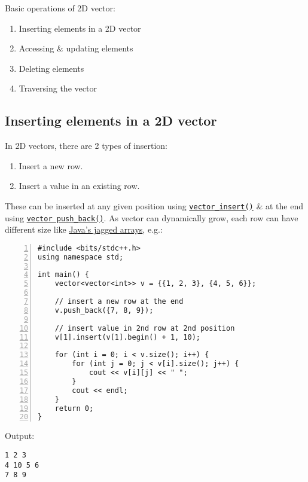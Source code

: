 \documentclass{article}
\begin{document}

Basic operations of 2D vector:
\begin{enumerate}
	\item Inserting elements in a 2D vector
	\item Accessing \& updating elements
	\item Deleting elements
	\item Traversing the vector
\end{enumerate}


\subsection{Inserting elements in a 2D vector}
In 2D vectors, there are 2 types of insertion:
\begin{enumerate}
	\item Insert a new row.
	\item Insert a value in an existing row.
\end{enumerate}
These can be inserted at any given position using \href{https://www.geeksforgeeks.org/vector-insert-function-in-cpp-stl/}{\tt vector\_insert()} \& at the end using \href{https://www.geeksforgeeks.org/vectorpush_back-vectorpop_back-c-stl/}{\tt vector push\_back()}. As vector can dynamically grow, each row can have different size like \href{https://www.geeksforgeeks.org/jagged-array-in-java/}{Java's jagged arrays}, e.g.:
\begin{Verbatim}[numbers=left,xleftmargin=5mm]
#include <bits/stdc++.h>
using namespace std;

int main() {
    vector<vector<int>> v = {{1, 2, 3}, {4, 5, 6}};
	
    // insert a new row at the end
    v.push_back({7, 8, 9});
	
    // insert value in 2nd row at 2nd position
    v[1].insert(v[1].begin() + 1, 10);
	
    for (int i = 0; i < v.size(); i++) {
        for (int j = 0; j < v[i].size(); j++) {
            cout << v[i][j] << " ";
        }
        cout << endl;
    }
    return 0;
}
\end{Verbatim}
Output:
\begin{verbatim}
1 2 3
4 10 5 6
7 8 9
\end{verbatim}

\end{document}
